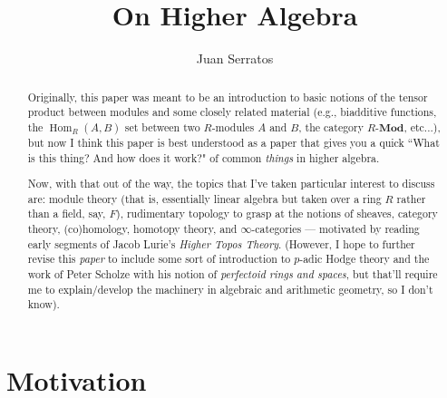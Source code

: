 \documentclass[12pt,reqno]{amsart}
\title{On Higher Algebra}
\author{Juan Serratos}
\theoremstyle{plain}
\DeclareMathOperator{\Hom}{Hom}
\begin{document}
\begin{abstract}
Originally, this paper was meant to be an introduction to basic notions of the tensor product between modules and some closely related material (e.g., biadditive functions, the $\Hom_R (A, B)$ set between two $R$-modules $A$ and $B$,  the category $R$-$\mathbf{Mod}$, etc...), but now I think this paper is best understood as a paper that gives you a quick ``What is this thing? And how does it work?" of common \textit{things} in higher algebra. 

Now, with that out of the way, the topics that I've taken particular interest to discuss are: module theory (that is, essentially linear algebra but taken over a ring $R$ rather than a field, say, $F$), rudimentary topology to grasp at the notions of sheaves, category theory,  (co)homology, homotopy theory, and $\infty$-categories — motivated by reading early segments of Jacob Lurie's \textit{Higher Topos Theory}.  (However, I hope to further revise this \textit{paper} to include some sort of introduction to $p$-adic Hodge theory and the work of Peter Scholze with his notion of \textit{perfectoid rings and spaces}, but that'll require me to explain/develop the machinery in algebraic and arithmetic geometry, so I don't know). 
\end{abstract}
\maketitle
\tableofcontents
\newpage
\section{Motivation}
\end{document}
